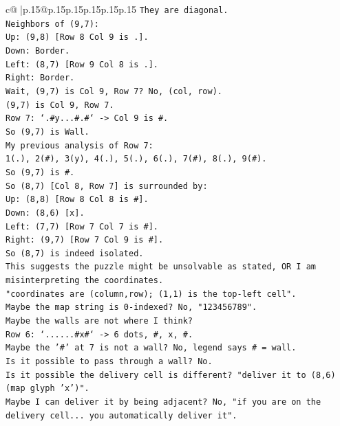 \documentclass{article}
\begin{document}
{\begin{supertabular}{c@{$\;$}|p{.15\linewidth}@{}p{.15\linewidth}p{.15\linewidth}p{.15\linewidth}p{.15\linewidth}p{.15\linewidth}}
{{{\texttt{They are diagonal.} \\
\texttt{Neighbors of (9,7):} \\
\texttt{Up: (9,8) {[}Row 8 Col 9 is .{]}.} \\
\texttt{Down: Border.} \\
\texttt{Left: (8,7) {[}Row 9 Col 8 is .{]}.} \\
\texttt{Right: Border.} \\
\texttt{Wait, (9,7) is Col 9, Row 7? No, (col, row).} \\
\texttt{(9,7) is Col 9, Row 7.} \\
\texttt{Row 7: `.\#y...\#.\#` {-}> Col 9 is \#.} \\
\texttt{So (9,7) is Wall.} \\
\texttt{My previous analysis of Row 7:} \\
\texttt{1(.), 2(\#), 3(y), 4(.), 5(.), 6(.), 7(\#), 8(.), 9(\#).} \\
\texttt{So (9,7) is \#.} \\
\texttt{So (8,7) {[}Col 8, Row 7{]} is surrounded by:} \\
\texttt{Up: (8,8) {[}Row 8 Col 8 is \#{]}.} \\
\texttt{Down: (8,6) {[}x{]}.} \\
\texttt{Left: (7,7) {[}Row 7 Col 7 is \#{]}.} \\
\texttt{Right: (9,7) {[}Row 7 Col 9 is \#{]}.} \\
\texttt{So (8,7) is indeed isolated.} \\
\texttt{This suggests the puzzle might be unsolvable as stated, OR I am misinterpreting the coordinates.} \\
\texttt{"coordinates are (column,row); (1,1) is the top{-}left cell".} \\
\texttt{Maybe the map string is 0{-}indexed? No, "123456789".} \\
\texttt{Maybe the walls are not where I think?} \\
\texttt{Row 6: `......\#x\#` {-}> 6 dots, \#, x, \#.} \\
\texttt{Maybe the '\#' at 7 is not a wall? No, legend says \# = wall.} \\
\texttt{Is it possible to pass through a wall? No.} \\
\texttt{Is it possible the delivery cell is different? "deliver it to (8,6) (map glyph 'x')".} \\
\texttt{Maybe I can deliver it by being adjacent? No, "if you are on the delivery cell... you automatically deliver it".} \\
}}}
\end{supertabular}}
\end{document}
